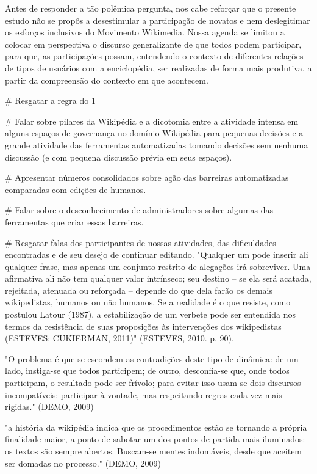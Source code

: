 Antes de responder a tão polêmica pergunta, nos cabe reforçar que o presente estudo não se propôs a desestimular a participação de novatos e nem deslegitimar os esforços inclusivos do Movimento Wikimedia. Nossa agenda se limitou a colocar em perspectiva o discurso generalizante de que todos podem participar, para que, as participações possam, entendendo o contexto de diferentes relações de tipos de usuários com a enciclopédia, ser realizadas de forma mais produtiva, a partir da compreensão do contexto em que acontecem.

# Resgatar a regra do 1%

# Falar sobre pilares da Wikipédia e a dicotomia entre a atividade intensa em alguns espaços de governança no domínio Wikipédia para pequenas decisões e a grande atividade das ferramentas automatizadas tomando decisões sem nenhuma discussão (e com pequena discussão prévia em seus espaços).

# Apresentar números consolidados sobre ação das barreiras automatizadas comparadas com edições de humanos.

# Falar sobre o desconhecimento de administradores sobre algumas das ferramentas que criar essas barreiras.

# Resgatar falas dos participantes de nossas atividades, das dificuldades encontradas e de seu desejo de continuar editando.
"Qualquer um pode inserir ali qualquer frase, mas apenas um conjunto restrito de alegações irá sobreviver. Uma afirmativa ali não tem qualquer valor intrínseco; seu destino – se ela será acatada, rejeitada, atenuada ou reforçada – depende do que dela farão os demais wikipedistas, humanos ou não humanos. Se a realidade é o que resiste, como postulou Latour (1987), a estabilização de um verbete pode ser entendida nos termos da resistência de suas proposições às intervenções dos wikipedistas (ESTEVES; CUKIERMAN, 2011)" (ESTEVES, 2010. p. 90).

"O problema é que se escondem as contradições deste tipo de dinâmica: de um lado, instiga-se que todos participem; de outro, desconfia-se que, onde todos participam, o resultado pode ser frívolo; para evitar isso usam-se dois discursos incompatíveis: participar à vontade, mas respeitando regras cada vez mais rígidas." (DEMO, 2009)

"a história da wikipédia indica que os procedimentos estão se tornando a própria finalidade maior, a ponto de sabotar um dos pontos de partida mais iluminados: os textos são sempre abertos. Buscam-se mentes indomáveis, desde que aceitem ser domadas no processo." (DEMO, 2009)

